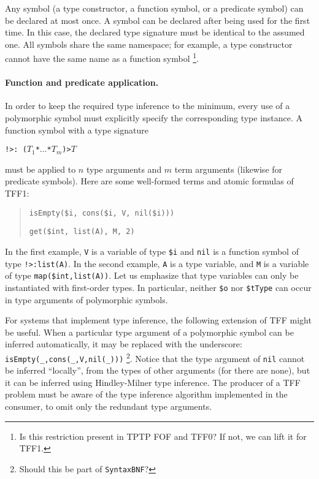 Any symbol (a type constructor, a function symbol, or a predicate symbol)
can be declared at most once. A symbol can be declared after being used
for the first time. In this case, the declared type signature must be
identical to the assumed one. All symbols share the same namespace; for
example, a type constructor cannot have the same name as a function symbol%
\footnote{Is this restriction present in TPTP FOF and TFF0? If not, we can
lift it for TFF1.}.

\paragraph{Function and predicate application.} In order to keep
the required type inference to the minimum, every use of a polymorphic
symbol must explicitly specify the corresponding type instance.
A function symbol with a type signature
\begin{center}
{\tt !>\;:\;%
($T_1$\;*\;$\dots$\;*\;$T_m$)\;>\;$T$}
\end{center}
must be applied to $n$ type arguments and $m$ term arguments
(likewise for predicate symbols). Here are some well-formed
terms and atomic formulas of TFF1:
\begin{quote}
\verb+isEmpty($i, cons($i, V, nil($i)))+
\par\medskip
\verb+get($int, list(A), M, 2)+
\end{quote}
In the first example, {\tt V} is a variable of type {\tt \$i}
and {\tt nil} is a function
symbol of type {\tt !>\;[A:\$tType]\;:\;list(A)}. In the second
example, {\tt A} is a type variable, and {\tt M} is a variable
of type {\tt map(\$int,list(A))}. Let us emphasize that type
variables can only be instantiated with first-order types.
In particular, neither \verb+$o+ nor \verb+$tType+ can occur
in type arguments of polymorphic symbols.

For systems that implement type inference, the following extension
of TFF might be useful. When a particular type argument of
a polymorphic symbol can be inferred automatically, it may be
replaced with the underscore: \verb+isEmpty(_,cons(_,V,nil(_)))+%
\footnote{Should this be part of {\tt SyntaxBNF}?}.
Notice that the type argument of {\tt nil} cannot be inferred
``locally'', from the types of other arguments (for there are none),
but it can be inferred using Hindley-Milner type inference.
The producer of a TFF problem must be aware of the type
inference algorithm implemented in the consumer, to omit
only the redundant type arguments.

